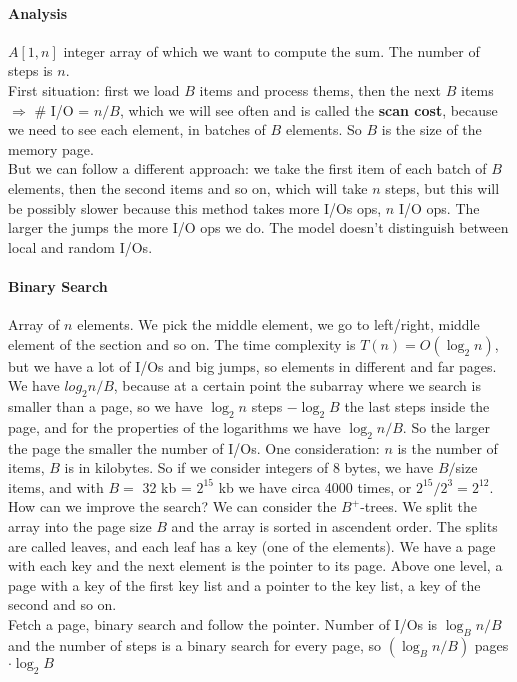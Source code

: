 \documentclass[10pt]{report}
\begin{document}
\paragraph{Analysis} $A[1, n]$ integer array of which we want to compute the sum. The number of steps is $n$.\\
First situation: first we load $B$ items and process thems, then the next $B$ items $\Rightarrow$ \# I/O = $n/B$, which we will see often and is called the \textbf{scan cost}, because we need to see each element, in batches of $B$ elements. So $B$ is the size of the memory page.\\
But we can follow a different approach: we take the first item of each batch of $B$ elements, then the second items and so on, which will take $n$ steps, but this will be possibly slower because this method takes more I/Os ops, $n$ I/O ops. The larger the jumps the more I/O ops we do. The model doesn't distinguish between local and random I/Os.
\paragraph{Binary Search} Array of $n$ elements. We pick the middle element, we go to left/right, middle element of the section and so on. The time complexity is $T(n) = O(\log_2 n)$, but we have a lot of I/Os and big jumps, so elements in different and far pages. We have $log_2 n/B$, because at a certain point the subarray where we search is smaller than a page, so we have $\log_2 n$ steps $- \log_2 B$ the last steps inside the page, and for the properties of the logarithms we have $\log_2 n/B$. So the larger the page the smaller the number of I/Os.  One consideration: $n$ is the number of items, $B$ is in kilobytes. So if we consider integers of 8 bytes, we have $B/$size items, and with $B =$ 32 kb = $2^{15}$ kb we have circa 4000 times, or $2^{15}/2^3 = 2^{12}$.\\
How can we improve the search? We can consider the $B^+$-trees. We split the array into the page size $B$ and the array is sorted in ascendent order. The splits are called leaves, and each leaf has a key (one of the elements). We have a page with each key and the next element is the pointer to its page. Above one level, a page with a key of the first key list and a pointer to the key list, a key of the second and so on.\\ %
Fetch a page, binary search and follow the pointer. Number of I/Os is $\log_B n/B$ and the number of steps is a binary search for every page, so $(\log_B n/B)$ pages $\cdot \log_2 B$
\end{document}
